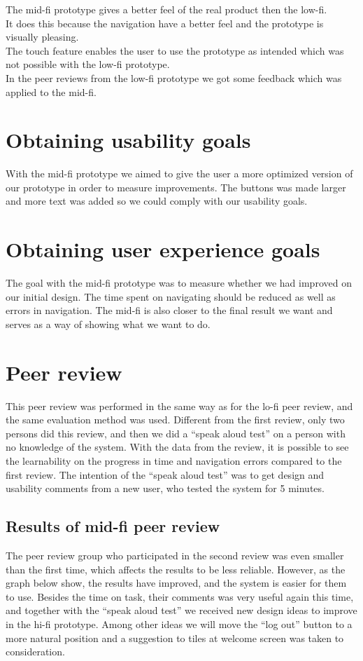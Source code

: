 The mid-fi prototype gives a better feel of the real product then the low-fi.\\
It does this because the navigation have a better feel and the prototype is visually pleasing.\\
The touch feature enables the user to use the prototype as intended which was not possible with the low-fi prototype.\\
In the peer reviews from the low-fi prototype we got some feedback which was applied to the mid-fi.\\

\section{Obtaining usability goals}
With the mid-fi prototype we aimed to give the user a more optimized version of our prototype in order to measure improvements. The buttons was made larger and more text was added so we could comply with our usability goals.

\section{Obtaining user experience goals}
The goal with the mid-fi prototype was to measure whether we had improved on our initial design. The time spent on navigating should be reduced as well as errors in navigation. The mid-fi is also closer to the final result we want and serves as a way of showing what we want to do.

\section{Peer review}
This peer review was performed in the same way as for the lo-fi peer review, and the same evaluation method was used. Different from the first review, only two persons did this review, and then we did a “speak aloud test” on a person with no knowledge of the system. With the data from the review, it is possible to see the learnability on the progress in time and navigation errors compared to the first review. The intention of the “speak aloud test” was to get design and usability comments from a new user, who tested the system for 5 minutes. \\
\subsection{Results of mid-fi peer review}
The peer review group who participated in the second review was even smaller than the first time, which affects the results to be less reliable. However, as the graph below show, the results have improved, and the system is easier for them to use. Besides the time on task, their comments was very useful again this time, and together with the “speak aloud test” we received new design ideas to improve in the hi-fi prototype. Among other ideas we will move the “log out” button to a more natural position and a suggestion to tiles at welcome screen was taken to consideration. \\

